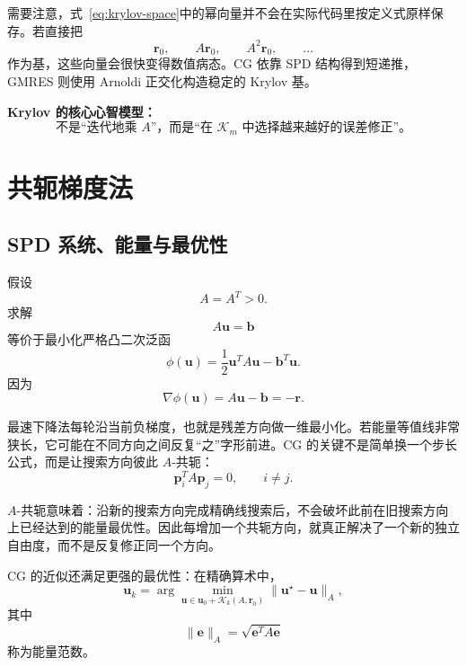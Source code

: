 需要注意，式~\eqref{eq:krylov-space}中的幂向量并不会在实际代码里按定义式原样保存。若直接把
\begin{equation}
\bm r_0,\qquad A\bm r_0,\qquad A^2\bm r_0,\qquad\ldots
\end{equation}
作为基，这些向量会很快变得数值病态。CG 依靠 SPD 结构得到短递推，GMRES 则使用 Arnoldi 正交化构造稳定的 Krylov 基。

\begin{keybox}
\textbf{Krylov 的核心心智模型：}
\[
\boxed{
\text{不是“迭代地乘 }A\text{”，而是“在 }\mathcal K_m\text{ 中选择越来越好的误差修正”。}
}
\]
\end{keybox}

\section{共轭梯度法}
\label{sec:cg}

\subsection{SPD 系统、能量与最优性}

假设
\begin{equation}
A=A^T>0.
\end{equation}
求解
\begin{equation}
A\bm u=\bm b
\end{equation}
等价于最小化严格凸二次泛函
\begin{equation}
\phi(\bm u)
=
\frac12\bm u^TA\bm u
-
\bm b^T\bm u.
\label{eq:cg-energy-functional}
\end{equation}
因为
\begin{equation}
\nabla\phi(\bm u)
=A\bm u-\bm b
=-\bm r.
\end{equation}

最速下降法每轮沿当前负梯度，也就是残差方向做一维最小化。若能量等值线非常狭长，它可能在不同方向之间反复“之”字形前进。CG 的关键不是简单换一个步长公式，而是让搜索方向彼此 $A$-共轭：
\begin{equation}
\bm p_i^TA\bm p_j=0,
\qquad
i\neq j.
\label{eq:cg-conjugacy}
\end{equation}

$A$-共轭意味着：沿新的搜索方向完成精确线搜索后，不会破坏此前在旧搜索方向上已经达到的能量最优性。因此每增加一个共轭方向，就真正解决了一个新的独立自由度，而不是反复修正同一个方向。

CG 的近似还满足更强的最优性：在精确算术中，
\begin{equation}
\boxed{
\bm u_k
=
\arg\min_{\bm u\in\bm u_0+\mathcal K_k(A,\bm r_0)}
\|\bm u^\star-\bm u\|_A,
}
\label{eq:cg-krylov-optimality}
\end{equation}
其中
\begin{equation}
\|\bm e\|_A
=
\sqrt{\bm e^TA\bm e}
\end{equation}
称为能量范数。

